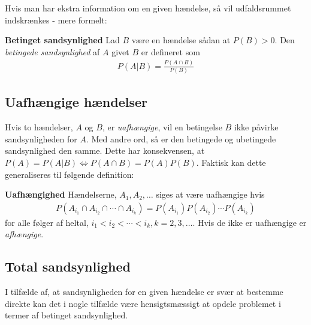 Hvis man har ekstra information om en given hændelse, så vil udfaldsrummet indskrænkes - mere formelt:\\
\begin{minipage}\textwidth
\begin{defn}\textbf{Betinget sandsynlighed} %
\newline
Lad $B$ være en hændelse sådan at $P(B)>0$. Den \textit{betingede sandsynlighed} af $A$ givet $B$ er defineret som
\begin{align*}
      \displaystyle P(A|B)=\frac{P(A\cap B)}{P(B)}
\end{align*}
\end{defn}
\end{minipage}

\subsection{Uafhængige hændelser}
Hvis to hændelser, $A$ og $B$, er \textit{uafhængige}, vil en betingelse $B$ ikke påvirke sandsynligheden for $A$. Med andre ord, så er den betingede og ubetingede sandsynlighed den samme. Dette har konsekvensen, at $P(A)=P(A|B)\Leftrightarrow P(A\cap B)=P(A)P(B)$. Faktisk kan dette generaliseres til følgende definition:\\
\begin{minipage}\textwidth
\begin{defn}\textbf{Uafhængighed} %
\newline
Hændelserne, $A_1,A_2,\dots$ siges at være uafhængige hvis
\begin{align*}
    P(A_{i_1}\cap A_{i_2}\cap\cdots\cap A_{i_k})=P(A_{i_1})P(A_{i_2})\cdots P(A_{i_k})
\end{align*}
for alle følger af heltal, $i_1<i_2<\cdots<i_k, k=2,3,\dots$.
Hvis de ikke er uafhængige er \textit{afhængige}.
\end{defn}
\end{minipage}
\subsection{Total sandsynlighed}
I tilfælde af, at sandsynligheden for en given hændelse er svær at bestemme direkte kan det i nogle tilfælde være hensigtsmæssigt at opdele problemet i termer af betinget sandsynlighed.



